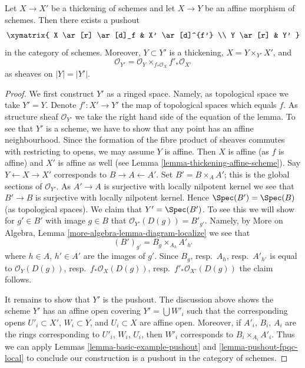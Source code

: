 \begin{lemma}
\label{lemma-pushout-along-thickening}
Let $X \to X'$ be a thickening of schemes and let $X \to Y$ be an affine
morphism of schemes. Then there exists a pushout
$$
\xymatrix{
X \ar[r] \ar[d]_f
&
X' \ar[d]^{f'}
\\
Y \ar[r]
&
Y'
}
$$
in the category of schemes. Moreover, $Y \subset Y'$ is a
thickening, $X = Y \times_{Y'} X'$, and
$$
\mathcal{O}_{Y'} = \mathcal{O}_Y \times_{f_*\mathcal{O}_X} f'_*\mathcal{O}_{X'}
$$
as sheaves on $|Y| = |Y'|$.
\end{lemma}

\begin{proof}
We first construct $Y'$ as a ringed space. Namely, as topological
space we take $Y' = Y$. Denote $f' : X' \to Y'$ the map of topological
spaces which equals $f$. As structure sheaf $\mathcal{O}_{Y'}$ we take
the right hand side of the equation of the lemma. To see that
$Y'$ is a scheme, we have to show that any point has an affine
neighbourhood. Since the formation of the fibre product of sheaves
commutes with restricting to opens, we may assume $Y$ is affine.
Then $X$ is affine (as $f$ is affine) and $X'$ is affine as well
(see Lemma \ref{lemma-thickening-affine-scheme}).
Say $Y \leftarrow X \rightarrow X'$ corresponds
to $B \rightarrow A \leftarrow A'$. Set $B' = B \times_A A'$; this
is the global sections of $\mathcal{O}_{Y'}$. As $A' \to A$ is surjective
with locally nilpotent kernel we see that $B' \to B$ is surjective
with locally nilpotent kernel. Hence $\Spec(B') = \Spec(B)$ (as
topological spaces). We claim that $Y' = \Spec(B')$. To see this
we will show for $g' \in B'$ with image $g \in B$ that
$\mathcal{O}_{Y'}(D(g)) = B'_{g'}$. Namely, by
More on Algebra, Lemma \ref{more-algebra-lemma-diagram-localize} we see that
$$
(B')_{g'} = B_g \times_{A_h} A'_{h'}
$$
where $h \in A$, $h' \in A'$ are the images of $g'$. Since
$B_g$, resp.\ $A_h$, resp.\ $A'_{h'}$ is equal to $\mathcal{O}_Y(D(g))$,
resp.\ $f_*\mathcal{O}_X(D(g))$, resp.\ $f'_*\mathcal{O}_{X'}(D(g))$ the
claim follows.

\medskip\noindent
It remains to show that $Y'$ is the pushout.
The discussion above shows the scheme $Y'$
has an affine open covering $Y' = \bigcup W'_i$
such that the corresponding opens
$U'_i \subset X'$, $W_i \subset Y$, and
$U_i \subset X$ are affine open.
Moreover, if $A'_i$, $B_i$, $A_i$ are the rings corresponding to
$U'_i$, $W_i$, $U_i$, then
$W'_i$ corresponds to $B_i \times_{A_i} A'_i$.
Thus we can apply Lemmas \ref{lemma-basic-example-pushout} and
\ref{lemma-pushout-fpqc-local} to conclude our construction is a pushout
in the category of schemes.
\end{proof}